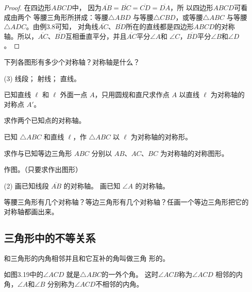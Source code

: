 \begin{proof}
在四边形$ABCD$中，
因为$\overline{AB}=\overline{BC}=\overline{CD}=\overline{DA}$，所
以四边形$ABCD$可看成由两个
等腰三角形所拼成：等腰$\triangle ABD$
与等腰$\triangle CBD$，或等腰$\triangle ABC$
与等腰$\triangle ADC$。由例3.8可知，
对角线$\overline{AC}$、$\overline{BD}$所在的直线都是四边形$ABCD$的对称
轴。所以，$\overline{AC}$、$\overline{BD}$互相垂直平分，并且$\overline{AC}$平分$\angle A$和
$\angle C$，$\overline{BD}$平分$\angle B$和$\angle D$。
\end{proof}

\begin{Practice}
\begin{question}
  \item 下列各图形有多少个对称轴？对称轴是什么？
  \begin{tasks}(3)
    \task 线段；
    \task 射线；
    \task 直线。
  \end{tasks}
  \item 已知直线 $\ell$ 和 $\ell$ 外面一点 $A$，只用圆规和直尺求作点 $A$ 以直线 $\ell$ 为对称轴的对称点 $A'$。
  \item 求作两个已知点的对称轴。
  \item 已知 $\triangle ABC$ 和直线 $\ell$，作 $\triangle ABC$ 以 $\ell$ 为对称轴的对称形。
  \item 求作与已知等边三角形 $ABC$ 分别以 $AB$、$AC$、$BC$ 为对称轴的对称图形。
  \item 作图。（只要求作出图形）
  \begin{tasks}(2)
    \task 画已知线段 $\overline{AB}$ 的对称轴。
    \task 画已知 $\angle A$ 的对称轴。
  \end{tasks}
  \item 等腰三角形有几个对称轴？等边三角形有几个对称轴？任画一个等边三角形把它的对称轴都画出来。
\end{question}
\end{Practice}

\subsection{三角形中的不等关系}
\begin{Definition}
    和三角形的内角相邻并且和它互补的角叫做三角
形的。
\end{Definition}
 
如图3.19中的$\angle ACD$
就是$\triangle ABC$的一外个角。
这时$\angle ACB$称为$\angle ACD$
相邻的内角，$\angle A$和$\angle B$
分别称为$\angle ACD$不相邻的内角。

